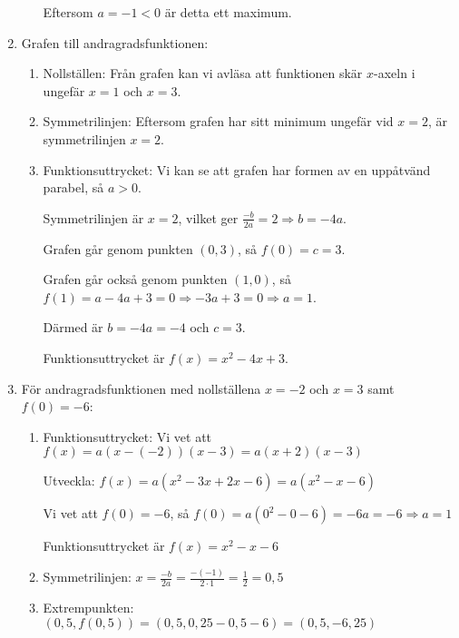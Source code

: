 \documentclass[a4paper,11pt]{article}
\begin{document}
\begin{enumerate}[label=\textbf{\arabic*.}]
\begin{enumerate}[label=\alph*)]
        Eftersom $a = -1 < 0$ är detta ett maximum.
    \end{enumerate}
    
    \item Grafen till andragradsfunktionen:
    \begin{enumerate}[label=\alph*)]
        \item Nollställen: Från grafen kan vi avläsa att funktionen skär $x$-axeln i ungefär $x = 1$ och $x = 3$.
        
        \item Symmetrilinjen: Eftersom grafen har sitt minimum ungefär vid $x = 2$, är symmetrilinjen $x = 2$.
        
        \item Funktionsuttrycket: Vi kan se att grafen har formen av en uppåtvänd parabel, så $a > 0$. 
        
        Symmetrilinjen är $x = 2$, vilket ger $\frac{-b}{2a} = 2 \Rightarrow b = -4a$.
        
        Grafen går genom punkten $(0, 3)$, så $f(0) = c = 3$.
        
        Grafen går också genom punkten $(1, 0)$, så $f(1) = a - 4a + 3 = 0 \Rightarrow -3a + 3 = 0 \Rightarrow a = 1$.
        
        Därmed är $b = -4a = -4$ och $c = 3$.
        
        Funktionsuttrycket är $f(x) = x^2 - 4x + 3$.
    \end{enumerate}
    
    \item För andragradsfunktionen med nollställena $x = -2$ och $x = 3$ samt $f(0) = -6$:
    \begin{enumerate}[label=\alph*)]
        \item Funktionsuttrycket: Vi vet att $f(x) = a(x-(-2))(x-3) = a(x+2)(x-3)$
        
        Utveckla: $f(x) = a(x^2 - 3x + 2x - 6) = a(x^2 - x - 6)$
        
        Vi vet att $f(0) = -6$, så $f(0) = a(0^2 - 0 - 6) = -6a = -6 \Rightarrow a = 1$
        
        Funktionsuttrycket är $f(x) = x^2 - x - 6$
        
        \item Symmetrilinjen: $x = \frac{-b}{2a} = \frac{-(-1)}{2 \cdot 1} = \frac{1}{2} = 0,5$
        
        \item Extrempunkten: $(0,5, f(0,5)) = (0,5, 0,25 - 0,5 - 6) = (0,5, -6,25)$
        

\end{enumerate}
\end{enumerate}
\end{document}
